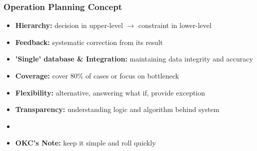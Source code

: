 \documentclass[10pt,handout,notes=show]{beamer}
\begin{document}
\begin{frame}
  \frametitle{Operation Planning Concept}

  \begin{itemize}
    \item \textbf{Hierarchy:} decision in upper-level $\rightarrow$ constraint in lower-level
    \item \textbf{Feedback:} systematic correction from its result
    \item \textbf{'Single' database \& Integration:} maintaining data integrity and accuracy
    \item \textbf{Coverage:} cover 80\% of cases or focus on \alert{bottleneck}
    \item \textbf{Flexibility:} \alert{alternative}, answering what if, provide \alert{exception}
    \item \textbf{Transparency:} understanding logic and algorithm behind system
    \item[]
    \item<2-> \textbf{OKC's Note:} keep it simple and roll quickly
  \end{itemize}

  \NextHalfLine


\end{frame}
\end{document}
